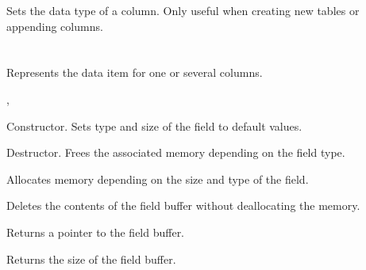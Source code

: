 
  
Sets the data type of a column. Only useful when creating new tables or
appending columns.

\section{}\label{wxqueryfield}

Represents the data item for one or several columns.




, 




Constructor. Sets type and size of the field to default values.
  


Destructor. Frees the associated memory depending on the field type.



Allocates memory depending on the size and type of the field.



Deletes the contents of the field buffer without deallocating the memory.



Returns a pointer to the field buffer.



Returns the size of the field buffer.


